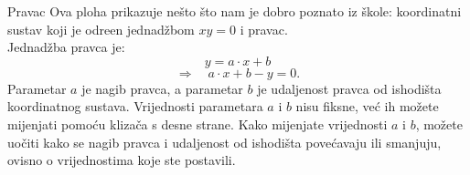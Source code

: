 \begin{surferPage}[Line]{Pravac}
Ova ploha prikazuje ne\v sto \v sto nam je dobro poznato iz \v skole: koordinatni sustav koji je odre\dj en jednad\v zbom $xy=0$ i pravac. \\
Jednad\v zba pravca je:
\[y=a\cdot x + b\]
\[ \Rightarrow \quad a\cdot x +b -y=0.\]
Parametar $a$ je nagib pravca, a parametar $b$ je udaljenost pravca od ishodi\v sta koordinatnog sustava.
\newline \newline
Vrijednosti parametara $a$ i $b$ nisu fiksne, ve\' c ih mo\v zete mijenjati pomo\' cu kliza\v ca s desne strane. Kako mijenjate vrijednosti $a$ i $b$, mo\v zete uo\v citi kako se nagib pravca i udaljenost od ishodi\v sta pove\' cavaju ili smanjuju, ovisno o vrijednostima koje ste postavili.
\end{surferPage}
